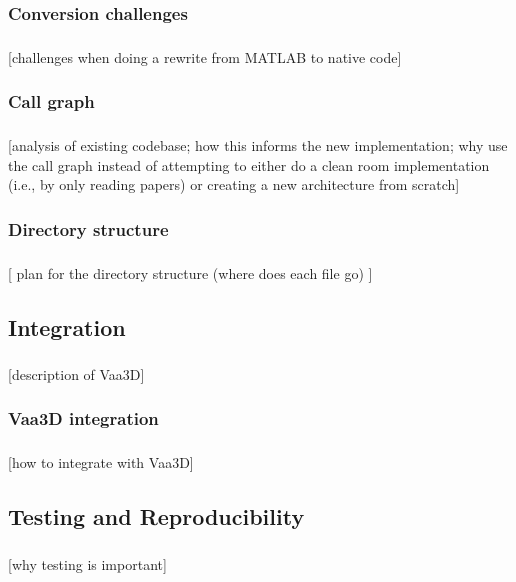 \documentclass{beamer}
\newcommand{\tbackground}[1]{#1}
\newcommand{\tmetrics}[1]{#1}
\newcommand{\tbackground}[1]{\textcolor{tbackground}{#1}}
\newcommand{\tmetrics}[1]{\textcolor{tmetrics}{#1}}
\begin{document}
\subsubsection{Conversion challenges}
\begin{frame}\frametitle{\subsubsecname}
	[\tbackground{challenges when doing a rewrite from MATLAB to native code}]
\end{frame}

\subsubsection{Call graph}
\begin{frame}\frametitle{\subsubsecname}
	[\tbackground{analysis of existing codebase; how this informs the new
	implementation; why use the call graph instead of
	attempting to either do a clean room implementation (i.e.,
	by only reading papers) or creating a new architecture
	from scratch}]
\end{frame}

\subsubsection{Directory structure}
\begin{frame}\frametitle{\subsubsecname}
	[ plan for the directory structure (where does each file
	go) ]
\end{frame}

\subsection{Integration}
\begin{frame}\frametitle{\subsecname}
	[\tbackground{description of Vaa3D}]
\end{frame}

\subsubsection{Vaa3D integration}
\begin{frame}\frametitle{\subsubsecname}
	[how to integrate with Vaa3D]
\end{frame}

\subsection{Testing and Reproducibility}
\begin{frame}\frametitle{\subsecname}
	[\tmetrics{why testing is important}]
\end{frame}
\end{document}
